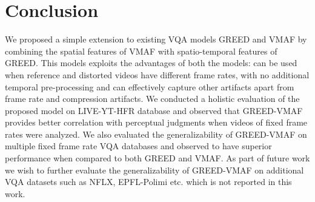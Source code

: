 \documentclass[conference]{IEEEtran}
\begin{document}
\section{Conclusion}
\label{sec:conclusion}
We proposed a simple extension to existing VQA models GREED and VMAF by combining the spatial features of VMAF with spatio-temporal features of GREED. This models exploits the advantages of both the models: can be used when reference and distorted videos have different frame rates, with no additional temporal pre-processing and can effectively capture other artifacts apart from frame rate and compression artifacts. We conducted a holistic evaluation of the proposed model on LIVE-YT-HFR database and observed that GREED-VMAF provides better correlation with perceptual judgments when videos of fixed frame rates were analyzed. We also evaluated the generalizability of GREED-VMAF on multiple fixed frame rate VQA databases and observed to have superior performance when compared to both GREED and VMAF. As part of future work we wish to further evaluate the generalizability of GREED-VMAF on additional VQA datasets such as NFLX, EPFL-Polimi etc. which is not reported in this work.


\end{document}
